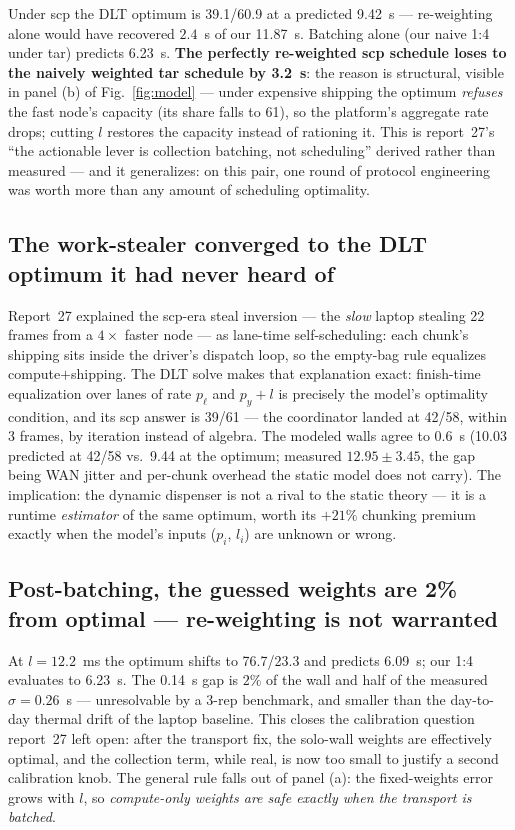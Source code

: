 \documentclass[
	english,
	letterpaper, oneside
]{article}
\begin{document}
Under scp the DLT optimum is 39.1/60.9 at a predicted 9.42~s ---
re-weighting alone would have recovered $2.4$~s of our 11.87~s. Batching
alone (our naive 1:4 under tar) predicts 6.23~s. \textbf{The perfectly
re-weighted scp schedule loses to the naively weighted tar schedule by
3.2~s}: the reason is structural, visible in panel (b) of
Fig.~\ref{fig:model} --- under expensive shipping the optimum
\emph{refuses} the fast node's capacity (its share falls to 61), so the
platform's aggregate rate drops; cutting $l$ restores the capacity
instead of rationing it. This is report~27's ``the actionable lever is
collection batching, not scheduling'' derived rather than measured ---
and it generalizes: on this pair, one round of protocol engineering was
worth more than any amount of scheduling optimality.

\subsection{The work-stealer converged to the DLT optimum it had never heard of}
\label{sec:stealer}

Report~27 explained the scp-era steal inversion --- the \emph{slow}
laptop stealing 22 frames from a $4\times$ faster node --- as lane-time
self-scheduling: each chunk's shipping sits inside the driver's dispatch
loop, so the empty-bag rule equalizes compute$+$shipping. The DLT solve
makes that explanation exact: finish-time equalization over lanes of rate
$p_\ell$ and $p_y + l$ is precisely the model's optimality condition, and
its scp answer is 39/61 --- the coordinator landed at 42/58, within 3
frames, by iteration instead of algebra. The modeled walls agree to
$0.6$~s (10.03 predicted at 42/58 vs.\ 9.44 at the optimum; measured
$12.95 \pm 3.45$, the gap being WAN jitter and per-chunk overhead the
static model does not carry). The implication: the dynamic dispenser is
not a rival to the static theory --- it is a runtime \emph{estimator} of
the same optimum, worth its $+21\%$ chunking premium exactly when the
model's inputs ($p_i$, $l_i$) are unknown or wrong.

\subsection{Post-batching, the guessed weights are 2\% from optimal --- re-weighting is not warranted}
\label{sec:tarok}

At $l = 12.2$~ms the optimum shifts to 76.7/23.3 and predicts 6.09~s; our
1:4 evaluates to 6.23~s. The 0.14~s gap is $2\%$ of the wall and half of
the measured $\sigma = 0.26$~s --- unresolvable by a 3-rep benchmark, and
smaller than the day-to-day thermal drift of the laptop baseline. This
closes the calibration question report~27 left open: after the transport
fix, the solo-wall weights are effectively optimal, and the collection
term, while real, is now too small to justify a second calibration knob.
The general rule falls out of panel (a): the fixed-weights error grows
with $l$, so \emph{compute-only weights are safe exactly when the
transport is batched}.
\end{document}
